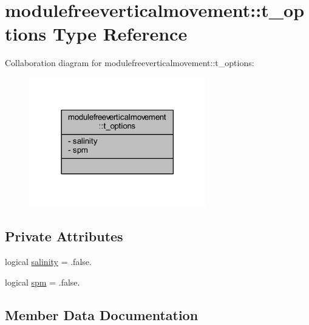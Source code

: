 \hypertarget{structmodulefreeverticalmovement_1_1t__options}{}\section{modulefreeverticalmovement\+:\+:t\+\_\+options Type Reference}
\label{structmodulefreeverticalmovement_1_1t__options}


Collaboration diagram for modulefreeverticalmovement\+:\+:t\+\_\+options\+:\nopagebreak
\begin{figure}[H]
\begin{center}
\leavevmode
\includegraphics[width=218pt]{structmodulefreeverticalmovement_1_1t__options__coll__graph}
\end{center}
\end{figure}
\subsection*{Private Attributes}
\begin{DoxyCompactItemize}
\item 
logical \mbox{\hyperlink{structmodulefreeverticalmovement_1_1t__options_acefe03332dbeced2026f97a77da87717}{salinity}} = .false.
\item 
logical \mbox{\hyperlink{structmodulefreeverticalmovement_1_1t__options_a5ada6c40c416f437d36767f32042db28}{spm}} = .false.
\end{DoxyCompactItemize}


\subsection{Member Data Documentation}
\mbox{\label{structmodulefreeverticalmovement_1_1t__options_acefe03332dbeced2026f97a77da87717}} 
